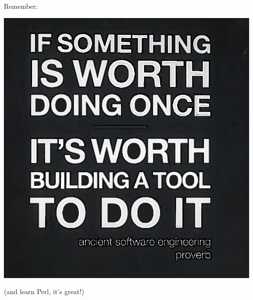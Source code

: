 \documentclass[aspectratio=169]{beamer}
\begin{document}
\begin{frame}
Remember:

\begin{center}
  \includegraphics[height=0.8\textheight]{Build.png}
\end{center}

(and learn Perl, it's great!)

\end{frame}
\end{document}
